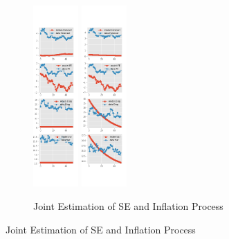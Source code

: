 \documentclass[]{article}
\begin{document}
\begin{figure}[htbp]
\begin{subfigure}[b]{\textwidth}
		\includegraphics[width=0.19\textwidth]{figures/sce_ni_est_diag3.png}
		\includegraphics[width=0.19\textwidth]{figures/sce_ni_est_diag4.png}
	\end{subfigure}
	\vspace{1em}
	\vfill
	\begin{subfigure}[b]{\textwidth}
		\centering
		\caption{Joint Estimation of SE and Inflation Process}
		\label{NI_diag_joint_SCE}

\end{subfigure}
\end{figure}
\end{document}
